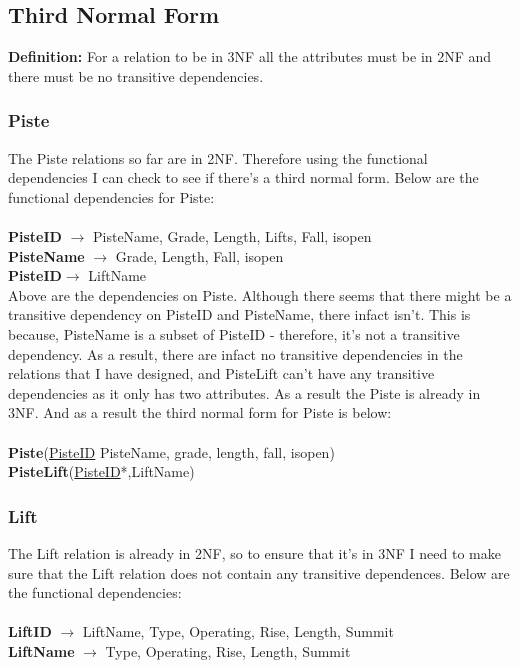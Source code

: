 \documentclass[12pt]{article}
\begin{document}
{\subsection{Third Normal Form}
\textbf{Definition:} For a relation to be in 3NF all the attributes must be in 2NF and there must be no transitive dependencies.
\subsubsection{Piste}
The Piste relations so far are in 2NF. Therefore using the functional dependencies I can check to see if there's a third normal form. Below are the functional dependencies for Piste:~\\\\
\-\hspace{1.8cm}\textbf{PisteID} $\rightarrow$ PisteName, Grade, Length, Lifts, Fall, isopen~\\
\-\hspace{1.8cm}\textbf{PisteName} $\rightarrow$ Grade, Length, Fall, isopen~\\
\-\hspace{1.8cm}\textbf{PisteID}$\rightarrow$ LiftName~\\
Above are the dependencies on Piste. Although there seems that there might be a transitive dependency on PisteID and PisteName, there infact isn't. This is because, PisteName is a subset of PisteID - therefore, it's not a transitive dependency. As a result, there are infact no transitive dependencies in the relations that I have designed, and PisteLift can't have any transitive dependencies as it only has two attributes. As a result the Piste is already in 3NF. And as a result the third normal form for Piste is below:~\\\\
\-\hspace{1.8cm}\textbf{Piste}(\uline{PisteID} PisteName, grade, length, fall, isopen)~\\
\-\hspace{1.8cm}\textbf{PisteLift}(\uline{PisteID}*,LiftName)
\subsubsection{Lift}
The Lift relation is already in 2NF, so to ensure that it's in 3NF I need to make sure that the Lift relation does not contain any transitive dependences. Below are the functional dependencies: ~\\\\
\-\hspace{1.8cm}\textbf{LiftID} $\rightarrow$ LiftName, Type, Operating, Rise, Length, Summit~\\
\-\hspace{1.8cm}\textbf{LiftName} $\rightarrow$ Type, Operating, Rise, Length, Summit}~\\
\end{document}

